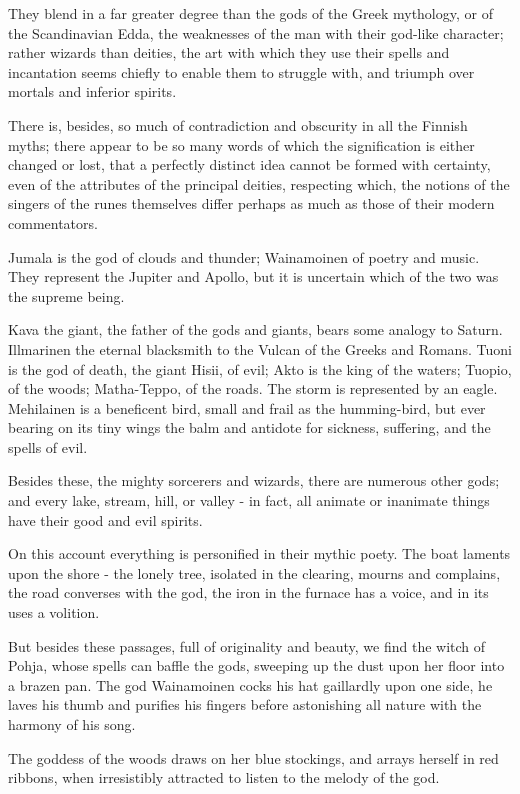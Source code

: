 \documentclass[11pt,a4paper]{article}
\begin{document}
They blend in a far greater degree than the gods of the Greek mythology, or of the Scandinavian Edda, the weaknesses of the man with their god-like character; rather wizards than deities, the art with which they use their spells and incantation seems chiefly to enable them to struggle with, and triumph over mortals and inferior spirits.

There is, besides, so much of contradiction and obscurity in all the Finnish myths; there appear to be so many words of which the signification is either changed or lost, that a perfectly distinct idea cannot be formed with certainty, even of the attributes of the principal deities, respecting which, the notions of the singers of the runes themselves differ perhaps as much as those of their modern commentators.

Jumala is the god of clouds and thunder; Wainamoinen of poetry and music. They represent the Jupiter and Apollo, but it is uncertain which of the two was the supreme being.

Kava the giant, the father of the gods and giants, bears some analogy to Saturn. Illmarinen the eternal blacksmith to the Vulcan of the Greeks and Romans. Tuoni is the god of death, the giant Hisii, of evil; Akto is the king of the waters; Tuopio, of the woods; Matha-Teppo, of the roads. The storm is represented by an eagle. Mehilainen is a beneficent bird, small and frail as the humming-bird, but ever bearing on its tiny wings the balm and antidote for sickness, suffering, and the spells of evil.

Besides these, the mighty sorcerers and wizards, there are numerous other gods; and every lake, stream, hill, or valley - in fact, all animate or inanimate things have their good and evil spirits.

On this account everything is personified in their mythic poety. The boat laments upon the shore - the lonely tree, isolated in the clearing, mourns and complains, the road converses with the god, the iron in the furnace has a voice, and in its uses a volition.

But besides these passages, full of originality and beauty, we find the witch of Pohja, whose spells can baffle the gods, sweeping up the dust upon her floor into a brazen pan. The god Wainamoinen cocks his hat gaillardly upon one side, he laves his thumb and purifies his fingers before astonishing all nature with the harmony of his song.

The goddess of the woods draws on her blue stockings, and arrays herself in red ribbons, when irresistibly attracted to listen to the melody of the god.
\end{document}
